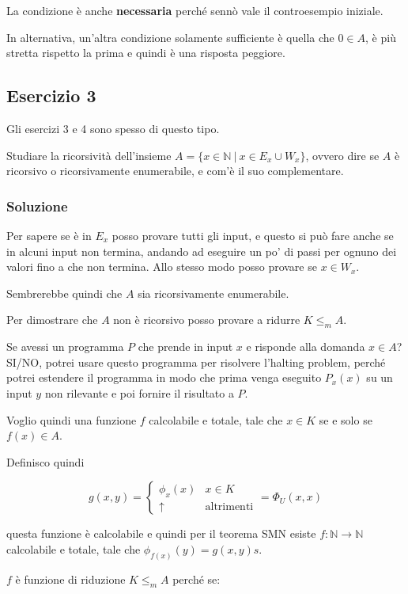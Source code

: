 La condizione è anche \textbf{necessaria} perché sennò vale il controesempio iniziale.

In alternativa, un'altra condizione solamente sufficiente è quella che $0 \in A$, è più stretta rispetto la prima e quindi è una risposta peggiore.

\subsection{Esercizio 3}

Gli esercizi 3 e 4 sono spesso di questo tipo.

Studiare la ricorsività dell'insieme $A = \{ x \in \mathbb{N} \: | \: x \in E_x \cup W_x \}$, ovvero dire se $A$ è ricorsivo o ricorsivamente enumerabile, e com'è il suo complementare.

\subsubsection{Soluzione}

Per sapere se è in $E_x$ posso provare tutti gli input, e questo si può fare anche se in alcuni input non termina, andando ad eseguire un po' di passi per ognuno dei valori fino a che non termina.
Allo stesso modo posso provare se $x \in W_x$.

Sembrerebbe quindi che $A$ sia ricorsivamente enumerabile.

Per dimostrare che $A$ non è ricorsivo posso provare a ridurre $K \leq_m A$.

Se avessi un programma $P$ che prende in input $x$ e risponde alla domanda $x \in A$? SI/NO, potrei usare questo programma per risolvere l'halting problem, perché potrei estendere il programma in modo che prima venga eseguito $P_x(x)$ su un input $y$ non rilevante e poi fornire il risultato a $P$.

Voglio quindi una funzione $f$ calcolabile e totale, tale che $x \in K$ se e solo se $f(x) \in A$.

Definisco quindi 

$$
g(x, y) = \begin{cases}
\phi_x(x) & x \in K \\
\uparrow &\text{altrimenti}
\end{cases} = \Phi_U(x,x)
$$

questa funzione è calcolabile e quindi per il teorema SMN esiste $f : \mathbb{N} \rightarrow \mathbb{N}$ calcolabile e totale, tale che $\phi_{f(x)}(y) = g(x,y)s$.

$f$ è funzione di riduzione $K \leq_m A$ perché se:

